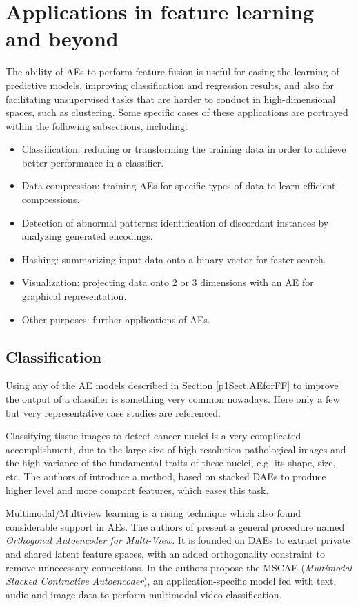 \section{Applications in feature learning and beyond}\label{p1Sec.Applications}

The ability of AEs to perform feature fusion is useful for easing the learning of predictive models, improving classification and regression results, and also for facilitating unsupervised tasks that are harder to conduct in high-dimensional spaces, such as clustering. Some specific cases of these applications are portrayed within the following subsections, including:
\begin{itemize}
  \setlength\itemsep{-.2em}
\item Classification: reducing or transforming the training data in order to achieve better performance in a classifier.
\item Data compression: training AEs for specific types of data to learn efficient compressions.
\item Detection of abnormal patterns: identification of discordant instances by analyzing generated encodings.
\item Hashing: summarizing input data onto a binary vector for faster search.
\item Visualization: projecting data onto 2 or 3 dimensions with an AE for graphical representation.
\item Other purposes: further applications of AEs.
\end{itemize}

\subsection{Classification}
Using any of the AE models described in Section \ref{p1Sect.AEforFF} to improve the output of a classifier is something very common nowadays. Here only a few but very representative case studies are referenced.

Classifying tissue images to detect cancer nuclei is a very complicated accomplishment, due to the large size of high-resolution pathological images and the high variance of the fundamental traits of these nuclei, e.g. its shape, size, etc. The authors of  introduce a method, based on stacked DAEs to produce higher level and more compact features, which eases this task.

Multimodal/Multiview learning  is a rising technique which also found considerable support in AEs. The authors of  present a general procedure named \textit{Orthogonal Autoencoder for Multi-View}. It is founded on DAEs to extract private and shared latent feature spaces, with an added orthogonality constraint to remove unnecessary connections. In  the authors propose the MSCAE (\textit{Multimodal Stacked Contractive Autoencoder}), an application-specific model fed with text, audio and image data to perform multimodal video classification. 

